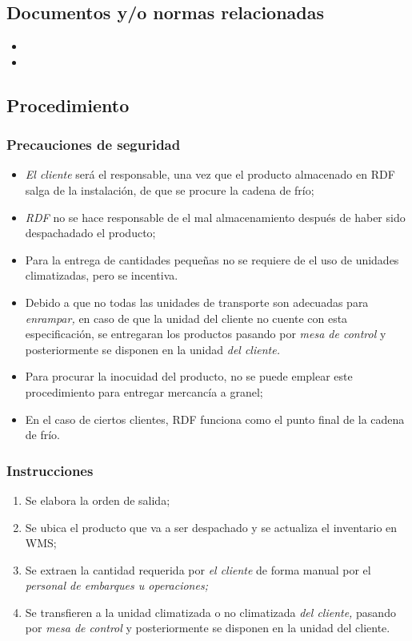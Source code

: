 \subsection{Documentos y/o normas relacionadas}
\begin{itemize}
	\item {}
	\item {}
\end{itemize}

\subsection{Procedimiento}

\subsubsection{Precauciones de seguridad}
\begin{itemize}
	\item \emph{El cliente} será el responsable, una vez que el producto almacenado en RDF salga de la instalación, de que se procure la cadena de frío;
	\item \emph{RDF} no se hace responsable de el mal almacenamiento después de haber sido despachadado el producto;
	\item Para la entrega de cantidades pequeñas no se requiere de el uso de unidades climatizadas, pero se incentiva.
	\item Debido a que no todas las unidades de transporte son adecuadas para \emph{enrampar,} en caso de que la unidad del cliente no cuente con esta especificación, se entregaran los productos pasando por \emph{mesa de control} y posteriormente se disponen en la unidad  \emph{del cliente.}
	\item Para procurar la inocuidad del producto, no se puede emplear este procedimiento para entregar mercancía a granel;
	\item En el caso de ciertos clientes, RDF funciona como el punto final de la cadena de frío.
\end{itemize}

\subsubsection{Instrucciones}
\begin{enumerate}
	\item Se elabora la orden de salida;
	\item Se ubica el producto que va a ser despachado y se actualiza el inventario en WMS;
	\item Se extraen la cantidad requerida por \emph{el cliente} de forma manual por el \emph{personal de embarques u operaciones;}
	\item Se transfieren a la unidad climatizada o no climatizada \emph{del cliente,} pasando por \emph{mesa de control} y posteriormente se disponen en la unidad del cliente.
\end{enumerate}

